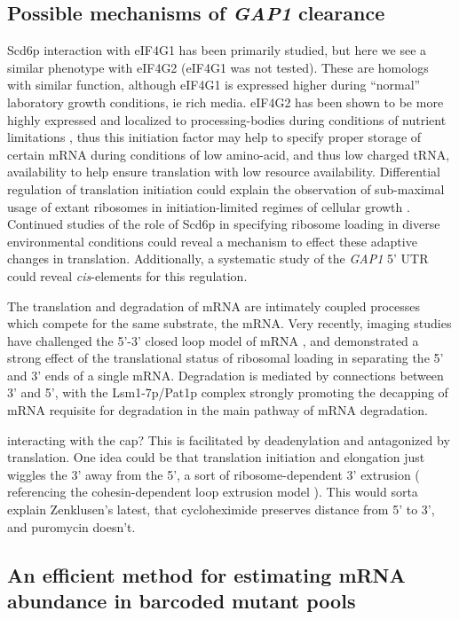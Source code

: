 \subsection{Possible mechanisms of \textit{GAP1} clearance}

Scd6p interaction with eIF4G1 has been primarily studied, 
but here we see a similar phenotype with eIF4G2 
(eIF4G1 was not tested). These are
homologs with similar function, although eIF4G1 is expressed higher
during “normal” laboratory growth conditions, ie rich media. 
eIF4G2 has been shown to be more highly expressed and localized to
processing-bodies during conditions of nutrient limitations 
\parencite{brengues2007accumulation}, 
thus this initiation factor may help to specify
proper storage of certain mRNA during conditions of low amino-acid,
and thus low charged tRNA, availability to help ensure translation
with low resource availability. Differential regulation of 
translation initiation could explain the observation of sub-maximal
usage of extant ribosomes in initiation-limited regimes of cellular
growth \parencite{kafri2016cost,metzl2017principles}.
Continued studies of the role of Scd6p in specifying ribosome
loading in diverse environmental conditions could reveal a mechanism
to effect these adaptive changes in translation.
Additionally, a systematic study of the \textit{GAP1} 5' UTR could
reveal \textit{cis}-elements for this regulation.

The translation and degradation of mRNA are intimately coupled
processes which compete for the same substrate, the mRNA. 
Very recently, imaging studies have challenged the 5'-3' closed loop
model of mRNA \parencite{adivarahan2017spatial}, and demonstrated
a strong effect of the translational status of ribosomal loading in 
separating the 5' and 3' ends of a single mRNA.
Degradation is mediated by connections between 3’ and 5’, 
with the Lsm1-7p/Pat1p complex strongly promoting the decapping of
mRNA requisite for degradation in the main pathway of mRNA
degradation.

 interacting with the cap? This is facilitated by
deadenylation and antagonized by translation. One idea could be that
translation initiation and elongation just wiggles the 3’ away from
the 5’, a sort of ribosome-dependent 3’ extrusion ( referencing the
cohesin-dependent loop extrusion model ).  This would sorta explain
Zenklusen’s latest, that cycloheximide preserves distance from 5’ to
3’, and puromycin doesn’t.  

\subsection{An efficient method for estimating mRNA abundance in
barcoded mutant pools}


